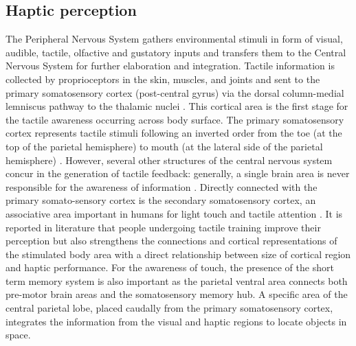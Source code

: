 \documentclass{vgtc}
\begin{document}
\subsection{Haptic perception}
The Peripheral Nervous System gathers environmental stimuli in form of visual, audible, tactile, olfactive and gustatory inputs and transfers them to the Central Nervous System for further elaboration and integration. Tactile information is collected by proprioceptors in the skin, muscles, and joints and sent to the primary somatosensory cortex (post-central gyrus) via the dorsal column-medial lemniscus pathway to the thalamic nuclei \cite{Blatow2007}. This cortical area is the first stage for the tactile awareness occurring across body surface. The primary somatosensory cortex represents tactile stimuli following an inverted order from the toe (at the top of the parietal hemisphere) to mouth (at the lateral side of the parietal hemisphere) \cite{Narici1999}. However, several other structures of the central nervous system concur in the generation of tactile feedback: generally, a single brain area is never responsible for the awareness of information \cite{Manzoni1986}. Directly connected with the primary somato-sensory cortex is the secondary somatosensory cortex, an associative area important in humans for light touch and tactile attention \cite{Eickhoff2005}. It is reported in literature that people undergoing tactile training improve their perception but also strengthens the connections and cortical representations of the stimulated body area \cite{Saito2007} with a direct relationship between size of cortical region and haptic performance. For the awareness of touch, the presence of the short term memory system is also important \cite{Edelman1989} as the parietal ventral area connects both pre-motor brain areas and the somatosensory memory hub. A specific area of the central parietal lobe, placed caudally from the primary somatosensory cortex, integrates the information from the visual and haptic regions to locate objects in space. 
\end{document}
